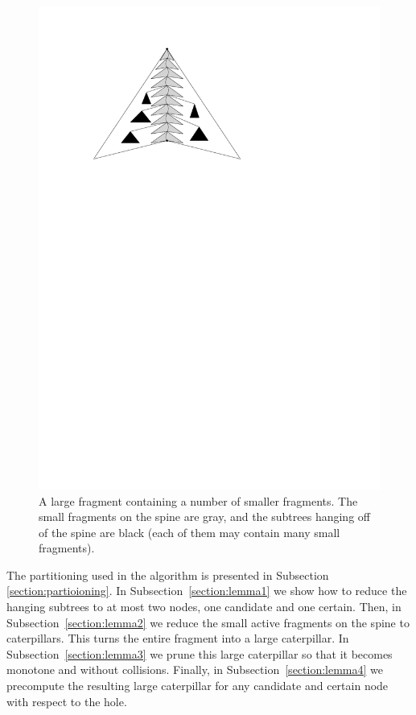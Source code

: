 \documentclass[11pt,a4paper]{article}
\theoremstyle{definition}
\theoremstyle{remark}
\begin{document}
\begin{figure}[h]
\begin{center}
\includegraphics[scale=1]{refinement}
\end{center}
\caption{A large fragment containing a number of smaller fragments. The small fragments on the spine are gray, and the subtrees hanging off of the spine are black (each of them may contain many small fragments). %
\label{figure of small fragments inside a large fragment}}
\end{figure}

The partitioning used in the algorithm is presented in Subsection \ref{section:partioioning}. In Subsection~\ref{section:lemma1} we show how to reduce the hanging subtrees to at most two nodes, one candidate and one certain. Then, in Subsection~\ref{section:lemma2} we reduce the small active fragments on the spine to caterpillars. This turns the entire fragment into a large caterpillar. In Subsection~\ref{section:lemma3} we prune this large caterpillar so that it becomes monotone and without collisions. Finally, in Subsection~\ref{section:lemma4} we precompute
the resulting large caterpillar for any candidate and certain node with respect to the hole.
\end{document}

